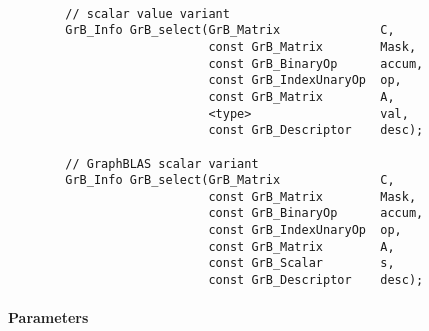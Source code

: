 \paragraph{\syntax}

\begin{verbatim}
        // scalar value variant
        GrB_Info GrB_select(GrB_Matrix              C,
                            const GrB_Matrix        Mask,
                            const GrB_BinaryOp      accum,
                            const GrB_IndexUnaryOp  op,
                            const GrB_Matrix        A,
                            <type>                  val,
                            const GrB_Descriptor    desc);

        // GraphBLAS scalar variant
        GrB_Info GrB_select(GrB_Matrix              C,
                            const GrB_Matrix        Mask,
                            const GrB_BinaryOp      accum,
                            const GrB_IndexUnaryOp  op,
                            const GrB_Matrix        A,
                            const GrB_Scalar        s,
                            const GrB_Descriptor    desc);
\end{verbatim}

\paragraph{Parameters}

